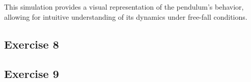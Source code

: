 \begin{solution}
This simulation provides a visual representation of the pendulum's behavior, allowing for intuitive understanding of its dynamics under free-fall conditions.

\end{solution}

\subsection{Exercise 8}
\lipsum[15]

\begin{solution}
    \lipsum[16]
\end{solution}

\subsection{Exercise 9}
\lipsum[17]

\begin{solution}
    \lipsum[18]
\end{solution}
